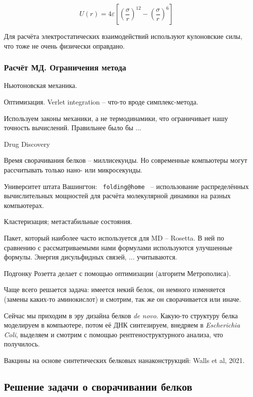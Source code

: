 \documentclass[main.tex]{subfiles}
\begin{document}
\[ U(r) = 4 \varepsilon \left[ \left(\frac{\sigma}{r}\right)^{12} - \left(\frac{\sigma}{r}\right)^6 \right] \]

Для расчёта электростатических взаимодействий используют кулоновские силы, что тоже не очень физически оправдано.

\subsubsection{Расчёт МД. Ограничения метода}

Ньютоновская механика.

Оптимизация.
Verlet integration -- что-то вроде симплекс-метода.

Используем законы механики, а не термодинамики, что ограничивает нашу точность вычислений.
Правильнее было бы ... %

Drug Discovery

Время сворачивания белков -- миллисекунды.
Но современные компьютеры могут рассчитывать только нано- или микросекунды.

Университет штата Вашингтон: \verb| folding@home | -- использование распределённых вычислительных мощностей для расчёта молекулярной динамики на разных компьютерах.

Кластеризация; метастабильные состояния. %

Пакет, который наиболее часто используется для MD -- Rosetta.
В ней по сравнению с рассматриваемыми нами формулами используются улучшенные формулы.
Энергия дисульфидных связей, ... учитываются.

Подгонку Розетта делает с помощью оптимизации (алгоритм Метрополиса).

Чаще всего решается задача: имеется некий белок, он немного изменяется (замены каких-то аминокислот) и смотрим, так же он сворачивается или иначе.

Сейчас мы приходим в эру дизайна белков \textit{de novo}.
Какую-то структуру белка моделируем в компьютере, потом её ДНК синтезируем, внедряем в  \textit{Escherichia Coli}, выделяем и смотрим с помощью рентгеноструктурного анализа, что получилось.

Вакцины на основе синтетических белковых нанаконструкций: Walls et al, 2021.

\subsection{Решение задачи о сворачивании белков}
\end{document}
